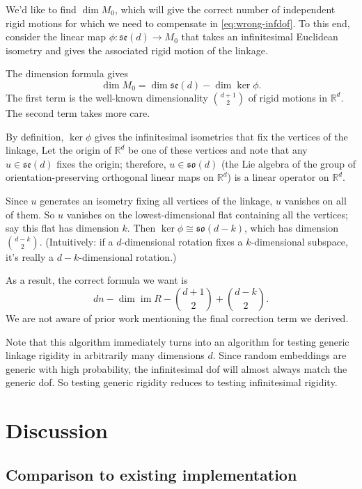 \documentclass[aps,prd,final,twocolumn,letterpaper,nofootinbib]{revtex4-1}
\newcommand\RR{\mathbb{R}}
\DeclareMathOperator\im{im}
\begin{document}
We'd like to find $\dim M_0$,
which will give the correct number of independent rigid motions
for which we need to compensate in \cref{eq:wrong-infdof}.
To this end,
consider the linear map $\phi\colon\mathfrak{se}(d) \to M_0$
that takes an infinitesimal Euclidean isometry
and gives the associated rigid motion of the linkage.

The dimension formula gives
\[
    \dim M_0 = \dim\mathfrak{se}(d) - \dim\ker\phi.
\]
The first term is the well-known dimensionality $\binom{d+1}{2}$
of rigid motions in $\RR^d$.
The second term takes more care.

By definition, $\ker\phi$ gives the infinitesimal isometries
that fix the vertices of the linkage,
Let the origin of $\RR^d$ be one of these vertices
and note that any $u\in \mathfrak{se}(d)$ fixes the origin;
therefore, $u\in\mathfrak{so}(d)$
(the Lie algebra of the group
of orientation-preserving orthogonal linear maps on $\RR^d$)
is a linear operator on $\RR^d$.

Since $u$ generates an isometry fixing all vertices of the linkage,
$u$ vanishes on all of them.
So $u$ vanishes on the lowest-dimensional flat containing all the vertices;
say this flat has dimension $k$.
Then $\ker\phi\cong\mathfrak{so}(d-k)$, which has dimension $\binom{d-k}{2}$.
(Intuitively: if a $d$-dimensional rotation fixes a $k$-dimensional subspace,
it's really a $d-k$-dimensional rotation.)

As a result, the correct formula we want is
\begin{equation}
    dn - \dim\im R - \binom{d+1}{2} + \binom{d-k}{2}.
\end{equation}
We are not aware of prior work mentioning the final correction term we derived.

Note that this algorithm immediately turns into an algorithm
for testing generic linkage rigidity in arbitrarily many dimensions $d$.
Since random embeddings are generic with high probability,
the infinitesimal dof will almost always match the generic dof.
So testing generic rigidity reduces to testing infinitesimal rigidity.


\section{Discussion}

\subsection{Comparison to existing implementation}
\end{document}
